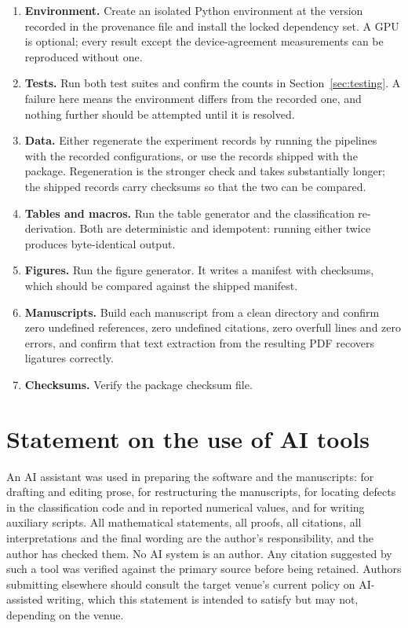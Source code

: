 \documentclass[11pt]{amsart}
\theoremstyle{remark}
\begin{document}
\begin{enumerate}[leftmargin=*]
\item \textbf{Environment.} Create an isolated Python environment at the version recorded in
the provenance file and install the locked dependency set. A GPU is optional; every result
except the device-agreement measurements can be reproduced without one.
\item \textbf{Tests.} Run both test suites and confirm the counts in
Section~\ref{sec:testing}. A failure here means the environment differs from the recorded
one, and nothing further should be attempted until it is resolved.
\item \textbf{Data.} Either regenerate the experiment records by running the pipelines with
the recorded configurations, or use the records shipped with the package. Regeneration is
the stronger check and takes substantially longer; the shipped records carry checksums so
that the two can be compared.
\item \textbf{Tables and macros.} Run the table generator and the classification
re-derivation. Both are deterministic and idempotent: running either twice produces
byte-identical output.
\item \textbf{Figures.} Run the figure generator. It writes a manifest with checksums, which
should be compared against the shipped manifest.
\item \textbf{Manuscripts.} Build each manuscript from a clean directory and confirm zero
undefined references, zero undefined citations, zero overfull lines and zero errors, and
confirm that text extraction from the resulting PDF recovers ligatures correctly.
\item \textbf{Checksums.} Verify the package checksum file.
\end{enumerate}

\section{Statement on the use of AI tools}
\label{sec:ai}

An AI assistant was used in preparing the software and the manuscripts: for drafting and
editing prose, for restructuring the manuscripts, for locating defects in the classification
code and in reported numerical values, and for writing auxiliary scripts. All mathematical
statements, all proofs, all citations, all interpretations and the final wording are the
author's responsibility, and the author has checked them. No AI system is an author. Any
citation suggested by such a tool was verified against the primary source before being
retained. Authors submitting elsewhere should consult the target venue's current policy on
AI-assisted writing, which this statement is intended to satisfy but may not, depending on
the venue.



\end{document}

